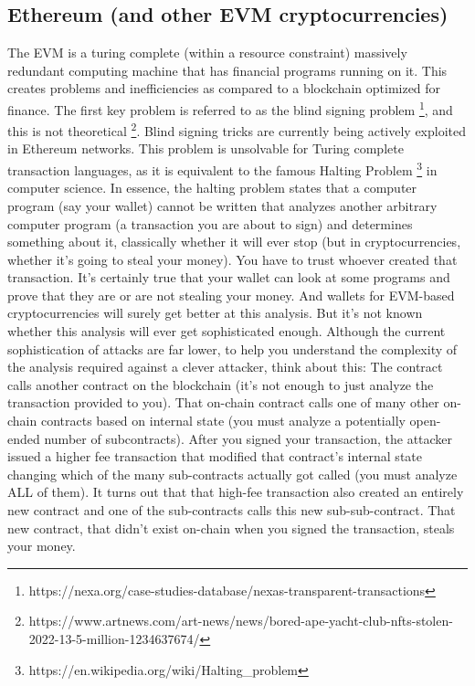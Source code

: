 \documentclass[a4paper, 11pt]{article}
\begin{document}
\subsection{Ethereum (and other EVM cryptocurrencies)}
The EVM is a turing complete (within a resource constraint) massively redundant computing machine that has financial programs running on it.  This creates problems and inefficiencies as compared to a blockchain optimized for finance.  
The first key problem is referred to as the blind signing problem \footnote{https://nexa.org/case-studies-database/nexas-transparent-transactions}, and this is not theoretical \footnote{https://www.artnews.com/art-news/news/bored-ape-yacht-club-nfts-stolen-2022-13-5-million-1234637674/}.  Blind signing tricks are currently being actively exploited in Ethereum networks.  This problem is unsolvable for Turing complete transaction languages, as it is equivalent to the famous Halting Problem \footnote{https://en.wikipedia.org/wiki/Halting\_problem} in computer science.  In essence, the halting problem states that a computer program (say your wallet) cannot be written that analyzes another arbitrary computer program (a transaction you are about to sign) and determines something about it, classically whether it will ever stop (but in cryptocurrencies, whether it’s going to steal your money).  You have to trust whoever created that transaction.  It’s certainly true that your wallet can look at some programs and prove that they are or are not stealing your money.  And wallets for EVM-based cryptocurrencies will surely get better at this analysis.  But it’s not known whether this analysis will ever get sophisticated enough.  
Although the current sophistication of attacks are far lower, to help you understand the complexity of the analysis required against a clever attacker, think about this:  The contract calls another contract on the blockchain (it’s not enough to just analyze the transaction provided to you).  That on-chain contract calls one of many other on-chain contracts based on internal state (you must analyze a potentially open-ended number of subcontracts).  After you signed your transaction, the attacker issued a higher fee transaction that modified that contract’s internal state changing which of the many sub-contracts actually got called (you must analyze ALL of them).  It turns out that that high-fee transaction also created an entirely new contract and one of the sub-contracts calls this new sub-sub-contract.  That new contract, that didn’t exist on-chain when you signed the transaction, steals your money.
\end{document}
